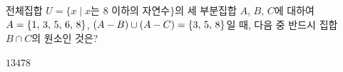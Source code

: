 전체집합 $U=\{x \mid x$는 $8$ 이하의 자연수$\}$의 세 부분집합 $A$, $B$, $C$에 대하여 $A=\{1,\mkern3mu 3,\mkern3mu 5,\mkern3mu 6,\mkern3mu 8\}$, $(A-B)\cup(A-C)=\{3,\mkern3mu 5,\mkern3mu 8\}$일 때, 다음 중 반드시 집합 $B\cap C$의 원소인 것은?
\begin{choices32}{$1$}{$3$}{$4$}{$7$}{$8$}\end{choices32}
